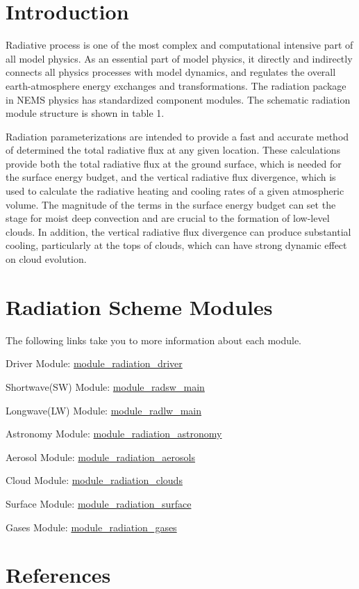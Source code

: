 \hypertarget{index_Introduction}{}\section{Introduction}\label{index_Introduction}
Radiative process is one of the most complex and computational intensive part of all model physics. As an essential part of model physics, it directly and indirectly connects all physics processes with model dynamics, and regulates the overall earth-\/atmosphere energy exchanges and transformations. The radiation package in N\+E\+MS physics has standardized component modules. The schematic radiation module structure is shown in table 1.



Radiation parameterizations are intended to provide a fast and accurate method of determined the total radiative flux at any given location. These calculations provide both the total radiative flux at the ground surface, which is needed for the surface energy budget, and the vertical radiative flux divergence, which is used to calculate the radiative heating and cooling rates of a given atmospheric volume. The magnitude of the terms in the surface energy budget can set the stage for moist deep convection and are crucial to the formation of low-\/level clouds. In addition, the vertical radiative flux divergence can produce substantial cooling, particularly at the tops of clouds, which can have strong dynamic effect on cloud evolution.\hypertarget{index_mainpage-components}{}\section{Radiation Scheme Modules}\label{index_mainpage-components}
The following links take you to more information about each module.
\begin{DoxyItemize}
\item Driver Module\+: \hyperlink{namespacemodule__radiation__driver}{module\+\_\+radiation\+\_\+driver}
\item Shortwave(\+S\+W) Module\+: \hyperlink{namespacemodule__radsw__main}{module\+\_\+radsw\+\_\+main}
\item Longwave(\+L\+W) Module\+: \hyperlink{namespacemodule__radlw__main}{module\+\_\+radlw\+\_\+main}
\item Astronomy Module\+: \hyperlink{namespacemodule__radiation__astronomy}{module\+\_\+radiation\+\_\+astronomy}
\item Aerosol Module\+: \hyperlink{namespacemodule__radiation__aerosols}{module\+\_\+radiation\+\_\+aerosols}
\item Cloud Module\+: \hyperlink{namespacemodule__radiation__clouds}{module\+\_\+radiation\+\_\+clouds}
\item Surface Module\+: \hyperlink{namespacemodule__radiation__surface}{module\+\_\+radiation\+\_\+surface}
\item Gases Module\+: \hyperlink{namespacemodule__radiation__gases}{module\+\_\+radiation\+\_\+gases}
\end{DoxyItemize}\hypertarget{index_References}{}\section{References}\label{index_References}
